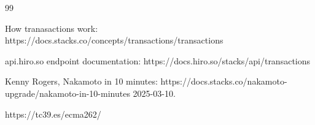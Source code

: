 \documentclass[12pt]{article}
\begin{document}
%
%
%
%







%
%
%
%
\begin {thebibliography}{99}
%


 How tranasactions work: https://docs.stacks.co/concepts/transactions/transactions


 api.hiro.so endpoint documentation: https://docs.hiro.so/stacks/api/transactions

 Kenny Rogers, Nakamoto in 10 minutes: 
https://docs.stacks.co/nakamoto-upgrade/nakamoto-in-10-minutes
2025-03-10.

https://tc39.es/ecma262/



\end {thebibliography}
\end{document}
